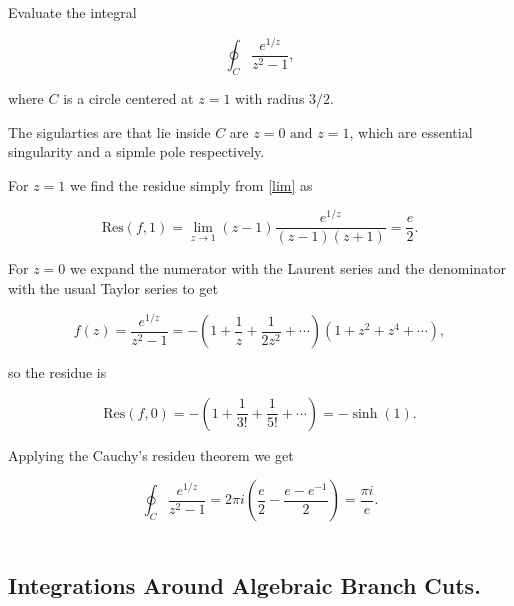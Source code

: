 \documentclass[english,a4paper,12pt]{report}
\begin{document}
{Evaluate the integral 

\begin{equation}
    \oint_{C} \frac{e^{1/z} }{z^2-1}, 
\end{equation}

where \(C\) is a circle centered at \(z = 1\) with radius \(3 /2\).  
}
{The sigularties are that lie inside \(C\) are \(z = 0 \text { and } z = 1\), which are essential singularity and a sipmle pole respectively. 

For \(z = 1\) we find the residue simply from \cref{lim} as 

\begin{equation}
    \text{Res}(f,1) = \lim_{z \to 1} (z-1)\frac{e^{1 /z} }{(z-1)(z+1)} = \frac{e}{2}.   
\end{equation}

For \(z = 0\) we expand the numerator with the Laurent series and the denominator with the usual Taylor series to get

\begin{equation}
    f(z) = \frac{e^{1 /z} }{z^2-1} =  -\left( 1+\frac{1}{z} + \frac{1}{2z^2} + \cdots    \right)\left( 1+z^2+z^4+\cdots  \right),
\end{equation}

so the residue is 

\begin{equation}
    \text{Res}(f,0) = -\left( 1+\frac{1}{3!}+\frac{1}{5!}  + \cdots   \right) = - \sinh (1).
\end{equation}

Applying the Cauchy's resideu theorem we get 

\begin{equation}
    \oint_{C} \frac{e^{1/z} }{z^2-1}= 2\pi i \left( \frac{e}{2} - \frac{e-e^{-1} }{2}   \right) = \frac{\pi i}{e}. 
\end{equation}
~
} 

\subsection{Integrations Around Algebraic Branch Cuts.}
\end{document}

